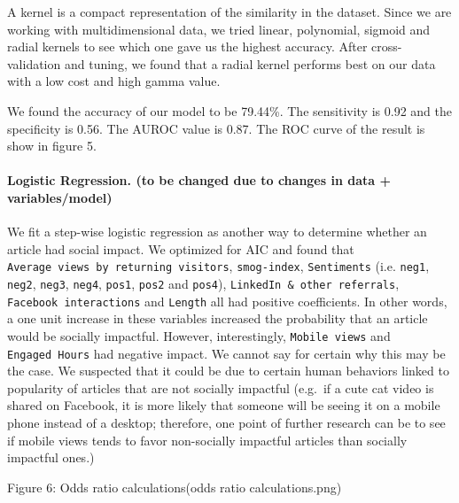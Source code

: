 \documentclass[10pt,letterpaper]{article}
\begin{document}
A kernel is a compact representation of the similarity in the dataset.
Since we are working with multidimensional data, we tried linear,
polynomial, sigmoid and radial kernels to see which one gave us the
highest accuracy. After cross-validation and tuning, we found that a
radial kernel performs best on our data with a low cost and high gamma
value.

We found the accuracy of our model to be 79.44\%. The sensitivity is
0.92 and the specificity is 0.56. The AUROC value is 0.87. The ROC curve
of the result is show in figure 5.

\hypertarget{logistic-regression.-to-be-changed-due-to-changes-in-data-variablesmodel}{%
\paragraph{Logistic Regression. (to be changed due to changes in data +
variables/model)}\label{logistic-regression.-to-be-changed-due-to-changes-in-data-variablesmodel}}

We fit a step-wise logistic regression as another way to determine
whether an article had social impact. We optimized for AIC and found
that \texttt{Average\ views\ by\ returning\ visitors},
\texttt{smog-index}, \texttt{Sentiments} (i.e. \texttt{neg1},
\texttt{neg2}, \texttt{neg3}, \texttt{neg4}, \texttt{pos1},
\texttt{pos2} and \texttt{pos4}),
\texttt{LinkedIn\ \&\ other\ referrals}, \texttt{Facebook\ interactions}
and \texttt{Length} all had positive coefficients. In other words, a one
unit increase in these variables increased the probability that an
article would be socially impactful. However, interestingly,
\texttt{Mobile\ views} and \texttt{Engaged\ Hours} had negative impact.
We cannot say for certain why this may be the case. We suspected that it
could be due to certain human behaviors linked to popularity of articles
that are not socially impactful (e.g.~if a cute cat video is shared on
Facebook, it is more likely that someone will be seeing it on a mobile
phone instead of a desktop; therefore, one point of further research can
be to see if mobile views tends to favor non-socially impactful articles
than socially impactful ones.)

Figure 6: Odds ratio calculations(odds ratio calculations.png)
\end{document}
